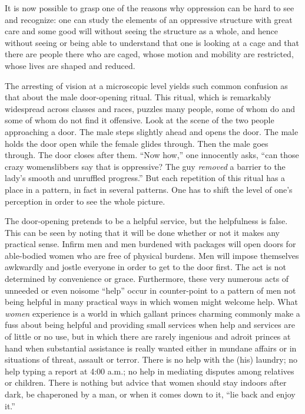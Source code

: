 \documentclass{article}
\begin{document}
It is now possible to grasp one of the reasons why oppression can be hard to
see and recognize: one can study the elements of an oppressive structure with
great care and some good will without seeing the structure as a whole, and
hence without seeing or being able to understand that one is looking at a cage
and that there are people there who are caged, whose motion and mobility are
restricted, whose lives are shaped and reduced.

The arresting of vision at a microscopic level yields such common confusion as
that about the male door-opening ritual. This ritual, which is remarkably
widespread across classes and races, puzzles many people, some of whom do and
some of whom do not find it offensive. Look at the scene of the two people
approaching a door. The male steps slightly ahead and opens the door. The male
holds the door open while the female glides through. Then the male goes
through. The door closes after them.  ``Now how,'' one innocently asks, ``can
those crazy womenslibbers say that is oppressive? The guy \emph{removed} a
barrier to the lady's smooth and unruffled progress.'' But each repetition of
this ritual has a place in a pattern, in fact in several patterns. One has to
shift the level of one's perception in order to see the whole picture.

The door-opening pretends to be a helpful service, but the helpfulness is
false. This can be seen by noting that it will be done whether or not it makes
any practical sense. Infirm men and men burdened with packages will open doors
for able-bodied women who are free of physical burdens.  Men will impose
themselves awkwardly and jostle everyone in order to get to the door first. The
act is not determined by convenience or grace.  Furthermore, these very
numerous acts of unneeded or even noisome ``help'' occur in counter-point to a
pattern of men not being helpful in many practical ways in which women might
welcome help. What \emph{women} experience is a world in which gallant princes
charming commonly make a fuss about being helpful and providing small services
when help and services are of little or no use, but in which there are rarely
ingenious and adroit princes at hand when substantial assistance is really
wanted either in mundane affairs or in situations of threat, assault or terror.
There is no help with the (his) laundry; no help typing a report at 4:00 a.m.;
no help in mediating disputes among relatives or children. There is nothing but
advice that women should stay indoors after dark, be chaperoned by a man, or
when it comes down to it, ``lie back and enjoy it.''
\end{document}
